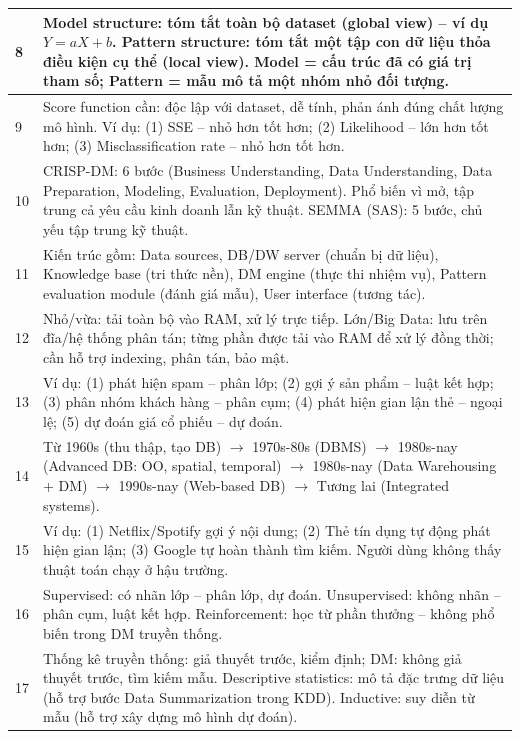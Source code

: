 \documentclass[10pt]{article}
\begin{document}
\begin{singlespace}
\begin{longtable}{|p{}|p{}|}
\hline
8 & Model structure: tóm tắt toàn bộ dataset (global view) -- ví dụ $Y = aX + b$. Pattern structure: tóm tắt một tập con dữ liệu thỏa điều kiện cụ thể (local view). Model = cấu trúc đã có giá trị tham số; Pattern = mẫu mô tả một nhóm nhỏ đối tượng. \\
\hline
9 & Score function cần: độc lập với dataset, dễ tính, phản ánh đúng chất lượng mô hình. Ví dụ: (1) SSE -- nhỏ hơn tốt hơn; (2) Likelihood -- lớn hơn tốt hơn; (3) Misclassification rate -- nhỏ hơn tốt hơn. \\
\hline
10 & CRISP-DM: 6 bước (Business Understanding, Data Understanding, Data Preparation, Modeling, Evaluation, Deployment). Phổ biến vì mở, tập trung cả yêu cầu kinh doanh lẫn kỹ thuật. SEMMA (SAS): 5 bước, chủ yếu tập trung kỹ thuật. \\
\hline
11 & Kiến trúc gồm: Data sources, DB/DW server (chuẩn bị dữ liệu), Knowledge base (tri thức nền), DM engine (thực thi nhiệm vụ), Pattern evaluation module (đánh giá mẫu), User interface (tương tác). \\
\hline
12 & Nhỏ/vừa: tải toàn bộ vào RAM, xử lý trực tiếp. Lớn/Big Data: lưu trên đĩa/hệ thống phân tán; từng phần được tải vào RAM để xử lý đồng thời; cần hỗ trợ indexing, phân tán, bảo mật. \\
\hline
13 & Ví dụ: (1) phát hiện spam -- phân lớp; (2) gợi ý sản phẩm -- luật kết hợp; (3) phân nhóm khách hàng -- phân cụm; (4) phát hiện gian lận thẻ -- ngoại lệ; (5) dự đoán giá cổ phiếu -- dự đoán. \\
\hline
14 & Từ 1960s (thu thập, tạo DB) $\to$ 1970s-80s (DBMS) $\to$ 1980s-nay (Advanced DB: OO, spatial, temporal) $\to$ 1980s-nay (Data Warehousing + DM) $\to$ 1990s-nay (Web-based DB) $\to$ Tương lai (Integrated systems). \\
\hline
15 & Ví dụ: (1) Netflix/Spotify gợi ý nội dung; (2) Thẻ tín dụng tự động phát hiện gian lận; (3) Google tự hoàn thành tìm kiếm. Người dùng không thấy thuật toán chạy ở hậu trường. \\
\hline
16 & Supervised: có nhãn lớp -- phân lớp, dự đoán. Unsupervised: không nhãn -- phân cụm, luật kết hợp. Reinforcement: học từ phần thưởng -- không phổ biến trong DM truyền thống. \\
\hline
17 & Thống kê truyền thống: giả thuyết trước, kiểm định; DM: không giả thuyết trước, tìm kiếm mẫu. Descriptive statistics: mô tả đặc trưng dữ liệu (hỗ trợ bước Data Summarization trong KDD). Inductive: suy diễn từ mẫu (hỗ trợ xây dựng mô hình dự đoán). \\
\hline

\end{longtable}
\end{singlespace}
\end{document}
